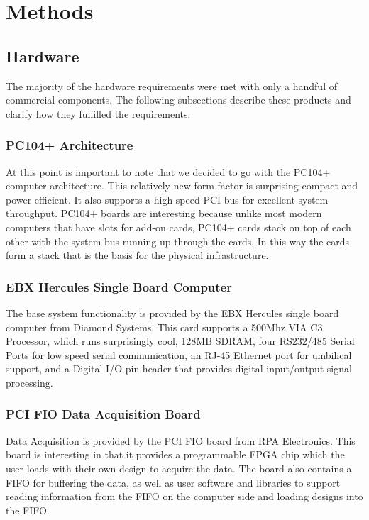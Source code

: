 \documentclass[11pt,titlepage]{article}
\begin{document}
\section{Methods}


\subsection{Hardware}
The majority of the hardware requirements were met with only a handful of commercial components. The following subsections describe these products and
clarify how they fulfilled the requirements.

\subsubsection{PC104+ Architecture}
At this point is important to note that we decided to go with the PC104+ computer architecture. This relatively new form-factor is surprising compact
and power efficient. It also supports a high speed PCI bus for excellent system throughput. PC104+ boards are interesting because unlike most modern 
computers that have slots for add-on cards, PC104+ cards stack on top of each other with the system bus running up through the cards. In this way the
cards form a stack that is the basis for the physical infrastructure.

\subsubsection{EBX Hercules Single Board Computer}
The base system functionality is provided by the EBX Hercules single board computer from Diamond Systems. This card supports a 500Mhz VIA C3 Processor,
which runs surprisingly cool, 128MB SDRAM, four RS232/485 Serial Ports for low speed serial communication, an RJ-45 Ethernet port for umbilical support,
and a Digital I/O pin header that provides digital input/output signal processing.


\subsubsection{PCI FIO Data Acquisition Board}
Data Acquisition is provided by the PCI FIO board from RPA Electronics. This board is interesting in that it provides a programmable FPGA chip which the 
user loads with their own design to acquire the data. The board also contains a FIFO for buffering the data, as well as user software and libraries to 
support reading information from the FIFO on the computer side and loading designs into the FIFO.
\end{document}
